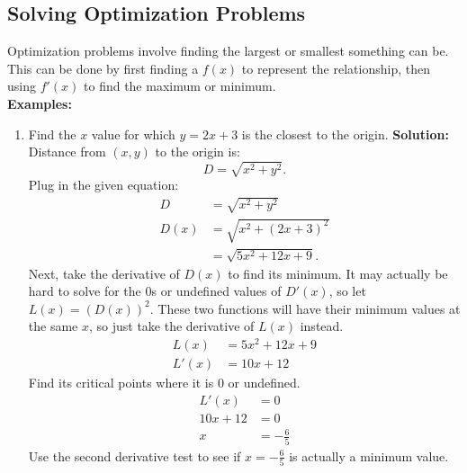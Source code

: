 \documentclass[12pt]{article}
\begin{document}
        \subsection{Solving Optimization Problems}
            Optimization problems involve finding the largest or smallest something can be. This can be done by first finding a $f(x)$ to represent the relationship, then using $f'(x)$ to find the maximum or minimum.
            \\ \textbf{Examples:}
            \begin{enumerate}
                \item Find the $x$ value for which $y=2x+3$ is the closest to the origin.
                \newline \newline
                \textbf{Solution:}
                    \\ Distance from $(x, y)$ to the origin is:
                    \[ D = \sqrt{x^2 + y^2}. \]
                    Plug in the given equation:
                    \begin{align*}
                        D &= \sqrt{x^2 + y^2} \\
                        D(x) &= \sqrt{x^2 + (2x+3)^2} \\
                        &= \sqrt{5x^2 + 12x + 9}.
                    \end{align*}
                    Next, take the derivative of $D(x)$ to find its minimum. It may actually be hard to solve for the $0$s or undefined values of $D'(x)$, so let $L(x) = \left( D(x) \right )^2$. These two functions will have their minimum values at the same $x$, so just take the derivative of $L(x)$ instead.
                    \begin{align*}
                        L(x) &= 5x^2 + 12x + 9 \\
                        L'(x) &= 10x + 12
                    \end{align*}
                    Find its critical points where it is $0$ or undefined.
                    \begin{align*}
                        L'(x) &= 0 \\
                        10x + 12 &= 0 \\
                        x &= -\frac{6}{5}
                    \end{align*}
                    Use the second derivative test to see if $x=-\frac{6}{5}$ is actually a minimum value.
                    \begin{align*}

\end{align*}
\end{enumerate}
\end{document}
